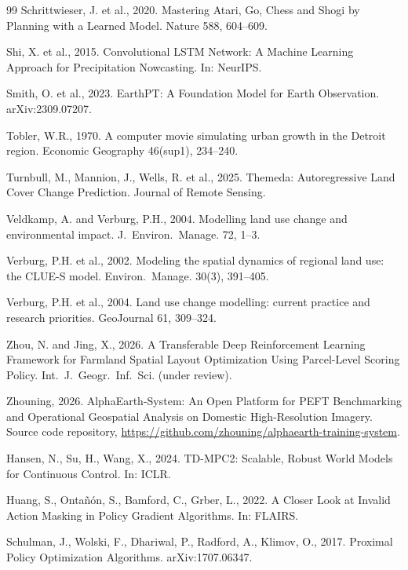 \documentclass{article}
\begin{document}
\begin{thebibliography}{99}
Schrittwieser, J. et al., 2020. Mastering Atari, Go, Chess and Shogi by Planning with a Learned Model. Nature 588, 604--609.

Shi, X. et al., 2015. Convolutional LSTM Network: A Machine Learning Approach for Precipitation Nowcasting. In: NeurIPS.

Smith, O. et al., 2023. EarthPT: A Foundation Model for Earth Observation. arXiv:2309.07207.

Tobler, W.R., 1970. A computer movie simulating urban growth in the Detroit region. Economic Geography 46(sup1), 234--240.

Turnbull, M., Mannion, J., Wells, R. et al., 2025. Themeda: Autoregressive Land Cover Change Prediction. Journal of Remote Sensing.

Veldkamp, A. and Verburg, P.H., 2004. Modelling land use change and environmental impact. J.~Environ.~Manage. 72, 1--3.

Verburg, P.H. et al., 2002. Modeling the spatial dynamics of regional land use: the CLUE-S model. Environ.~Manage. 30(3), 391--405.

Verburg, P.H. et al., 2004. Land use change modelling: current practice and research priorities. GeoJournal 61, 309--324.

Zhou, N. and Jing, X., 2026. A Transferable Deep Reinforcement Learning Framework for Farmland Spatial Layout Optimization Using Parcel-Level Scoring Policy. Int.~J.~Geogr.~Inf.~Sci. (under review).

Zhouning, 2026. AlphaEarth-System: An Open Platform for PEFT Benchmarking and Operational Geospatial Analysis on Domestic High-Resolution Imagery. Source code repository, \url{https://github.com/zhouning/alphaearth-training-system}.

Hansen, N., Su, H., Wang, X., 2024. TD-MPC2: Scalable, Robust World Models for Continuous Control. In: ICLR.

Huang, S., Onta\~{n}\'{o}n, S., Bamford, C., Grber, L., 2022. A Closer Look at Invalid Action Masking in Policy Gradient Algorithms. In: FLAIRS.

Schulman, J., Wolski, F., Dhariwal, P., Radford, A., Klimov, O., 2017. Proximal Policy Optimization Algorithms. arXiv:1707.06347.

\end{thebibliography}
\end{document}
